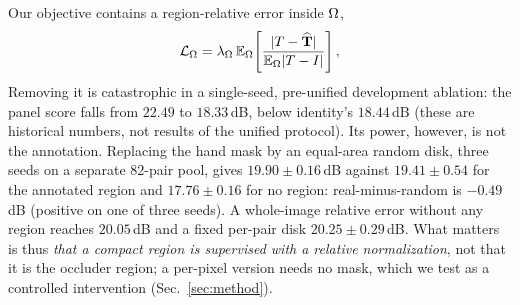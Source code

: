 Our objective contains a region-relative error inside $\Omega$,
\begin{equation}
\mathcal{L}_{\Omega}=\lambda_{\Omega}\,\mathbb{E}_{\Omega}\!\left[\frac{|T-\widehat{\mathbf{T}}|}{\mathbb{E}_{\Omega}|T-I|}\right],
\label{eq:lom}
\end{equation}
Removing it is catastrophic in a single-seed, pre-unified development ablation: the
panel score falls from $22.49$ to $18.33$\,dB, below identity's $18.44$\,dB (these are
historical numbers, not results of the unified protocol). Its power, however, is not the annotation. Replacing the hand mask by an
equal-area random disk, three seeds on a separate $82$-pair pool, gives $19.90\pm0.16$\,dB
against $19.41\pm0.54$ for the annotated region and $17.76\pm0.16$ for no region:
real-minus-random is $-0.49$\,dB (positive on one of three seeds). A whole-image relative
error without any region reaches $20.05$\,dB and a fixed per-pair disk $20.25\pm0.29$\,dB.
What matters is thus \emph{that a compact region is supervised with a relative
normalization}, not that it is the occluder region; a per-pixel version needs no mask,
which we test as a controlled intervention (Sec.~\ref{sec:method}).
